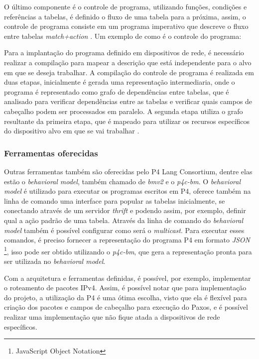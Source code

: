 \documentclass[
    12pt,
    openright, 
    oneside,
    a4paper,
    french,
    english,
    brazil
    ]{facom-ufu-abntex2}
\theoremstyle{definition}
\begin{document}
O último componente é o controle de programa, utilizando funções, condições e referências
a tabelas, é definido o fluxo de uma tabela para a próxima, assim, o controle de programa
consiste em um programa imperativo que descreve o fluxo entre tabelas \emph{match+action} 
\cite{bosshart2014p4}. Um exemplo de como é o controle do programa: 



Para a implantação do programa definido em dispositivos de rede, é necessário realizar
a compilação para mapear a descrição que está independente para o alvo em que se deseja
trabalhar. A compilação do controle de programa é realizada em duas etapas, inicialmente
é gerada uma representação intermediaria, onde o programa é representado como grafo de
dependências entre tabelas, que é analisado para verificar dependências entre as tabelas
e verificar quais campos de cabeçalho podem ser processados em paralelo. A segunda etapa
utiliza o grafo resultante da primeira etapa, que é mapeado para utilizar os recursos
específicos do dispositivo alvo em que se vai trabalhar \cite{bosshart2014p4}.

\subsubsection{Ferramentas oferecidas}
Outras ferramentas também são oferecidas pelo P4 Lang Consortium, dentre elas estão o 
\emph{behavioral model}, também chamado de \emph{bmv2} e o \emph{p4c-bm}. O \emph{behavioral model} é utilizado 
para executar os programas escritos em P4, oferece também na linha de comando uma interface 
para popular as tabelas inicialmente, se conectando através de um servidor \emph{thrift} e podendo 
assim, por exemplo, definir qual a ação padrão de uma tabela. Através da linha de comando do 
\emph{behavioral model} também é possível configurar como será o \emph{multicast}. Para executar esses 
comandos, é preciso fornecer a representação do programa P4 em formato \emph{JSON}
\footnote{JavaScript Object Notation}, isso pode ser obtido utilizando o \emph{p4c-bm}, que gera a 
representação pronta para ser utilizada no \emph{behavioral model}.

Com a arquitetura e ferramentas definidas, é possível, por exemplo, implementar o roteamento 
de pacotes IPv4. Assim, é possível notar que para implementação do projeto, a utilização da P4
é uma ótima escolha, visto que ela é flexível para criação dos pacotes e campos de cabeçalho
para execução do Paxos, e é possível realizar uma implementação que não fique atada a 
dispositivos de rede específicos.
\end{document}
